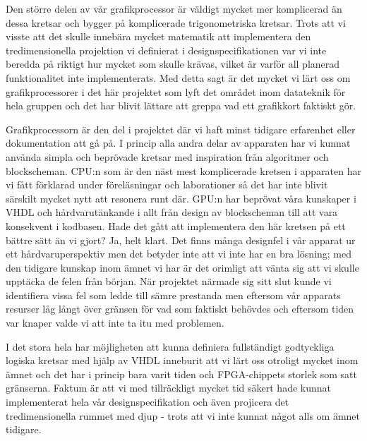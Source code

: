 \documentclass[a4paper]{article}
\begin{document}
        Den större
        delen av vår grafikprocessor är väldigt mycket mer komplicerad än dessa kretsar och bygger
        på komplicerade trigonometriska kretsar. Trots att vi visste att det skulle innebära mycket
        matematik att implementera den tredimensionella projektion vi definierat i 
        designspecifikationen var vi inte beredda på riktigt hur mycket som skulle krävas, vilket är
        varför all planerad funktionalitet inte implementerats. Med detta sagt är det mycket vi
        lärt oss om grafikprocessorer i det här projektet som lyft det området inom datateknik för
        hela gruppen och det har blivit lättare att greppa vad ett grafikkort faktiskt gör.

        Grafikprocessorn är den del i projektet där vi haft minst tidigare erfarenhet eller
        dokumentation att gå på. I princip alla andra delar av apparaten har vi kunnat använda
        simpla och beprövade kretsar med inspiration från algoritmer och blockscheman. CPU:n som är
        den näst mest komplicerade kretsen i apparaten har vi fått förklarad under föreläsningar och
        laborationer så det har inte blivit särskilt mycket nytt att resonera runt där. GPU:n har
        beprövat våra kunskaper i VHDL och hårdvarutänkande i allt från design av blockscheman till
        att vara konsekvent i kodbasen. Hade det gått att implementera den här kretsen på ett bättre
        sätt än vi gjort? Ja, helt klart. Det finns många designfel i vår apparat ur ett
        hårdvaruperspektiv men det betyder inte att vi inte har en bra lösning; med den tidigare
        kunskap inom ämnet vi har är det orimligt att vänta sig att vi skulle upptäcka de felen från
        början. När projektet närmade sig sitt slut kunde vi identifiera vissa fel som ledde till
        sämre prestanda men eftersom vår apparats resurser låg långt över gränsen för vad som
        faktiskt behövdes och eftersom tiden var knaper valde vi att inte ta itu med problemen.

        I det stora hela har möjligheten att kunna definiera fullständigt godtyckliga logiska 
        kretsar med hjälp av VHDL inneburit att vi lärt oss otroligt mycket inom ämnet och det har
        i princip bara varit tiden och FPGA-chippets storlek som satt gränserna. Faktum är att vi
        med tillräckligt mycket tid säkert hade kunnat implementerat hela vår designspecifikation
        och även projicera det tredimensionella rummet med djup - trots att vi inte kunnat något
        alls om ämnet tidigare.
\end{document}
